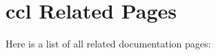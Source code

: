 \section{ccl Related Pages}
Here is a list of all related documentation pages:\begin{CompactList}
\item {}

\end{CompactList}
